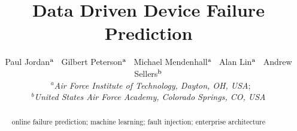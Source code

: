 \documentclass[]{tEIS2e}
\begin{document}

\title{Data Driven Device Failure Prediction}

\author{Paul Jordan$^{\rm a}$ \
        Gilbert Peterson$^{\rm a}$ \
        Michael Mendenhall$^{\rm a}$ \
        Alan Lin$^{\rm a}$ \
        Andrew Sellers$^{\rm b}$ \\\vspace{6pt} \
        $^{a}${\em{Air Force Institute of Technology, Dayton, OH, USA}}; \\
        $^{b}${\em{United States Air Force Academy, Colorado Springs, CO, USA}}}
  
\maketitle

\begin{abstract}


\begin{keywords}
online failure prediction; machine learning; fault injection; enterprise
architecture
\end{keywords}

\end{abstract}



 

\label{lastpage}
\end{document}
